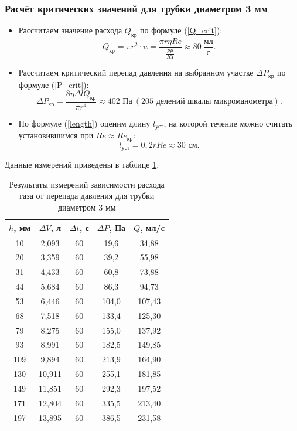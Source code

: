 \documentclass[a4paper, 12pt]{article}
\begin{document}
    \subsubsection*{Расчёт критических значений для трубки диаметром 3 мм}

    \begin{itemize}
        \item Рассчитаем значение расхода $Q_{\text{кр}}$ по формуле (\ref{Q_crit}): \[Q_{\text{кр}} = \pi r^2 \cdot \overline{u} = \frac{\pi r \eta Re}{\frac{p \mu}{RT}} \approx 80 \: \frac{\text{мл}}{\text{с}}. \] 
        
        \item  Рассчитаем критический перепад давления на выбранном участке $\Delta P_{\text{кр}}$ по формуле (\ref{P_crit}): \[ \Delta P_{\text{кр}} = \frac{8 \eta \Delta l Q_\text{кр}}{\pi r^4} \approx 402 \text{ Па} \: (205 \text{ делений шкалы микроманометра}). \]

        \item По формуле (\ref{length}) оценим длину $l_\text{уст}$, на которой течение можно считать установившимся при $Re \approx Re_\text{кр}$: \[ l_{\text{уст}} = 0,2 r Re \approx 30 \text{ см}. \]
 
    \end{itemize}
    
    \noindent Данные измерений приведены в таблице \ref{tab:q(p)_3mm}.

    \begin{table}[H]
        \centering
        \begin{tabular}{|c|c|c|c|c|}
            \hline
            $h$, мм & $\Delta V$, л & $\Delta t$, с & $\Delta P$, Па & $Q$, мл/c \\ \hline
            10 & 2,093 & 60 & 19,6 & 34,88 \\ \hline
            20 & 3,359 & 60 & 39,2 & 55,98 \\ \hline
            31 & 4,433 & 60 & 60,8 & 73,88 \\ \hline
            44 & 5,684 & 60 & 86,3 & 94,73 \\ \hline
            53 & 6,446 & 60 & 104,0 & 107,43 \\ \hline
            68 & 7,518 & 60 & 133,4 & 125,30 \\ \hline
            79 & 8,275 & 60 & 155,0 & 137,92 \\ \hline
            93 & 8,991 & 60 & 182,5 & 149,85 \\ \hline
            109 & 9,894 & 60 & 213,9 & 164,90 \\ \hline
            130 & 10,911 & 60 & 255,1 & 181,85 \\ \hline
            149 & 11,851 & 60 & 292,3 & 197,52 \\ \hline
            171 & 12,804 & 60 & 335,5 & 213,40 \\ \hline
            197 & 13,895 & 60 & 386,5 & 231,58 \\ \hline
        \end{tabular}
        \caption{Результаты измерений зависимости расхода газа от перепада давления для трубки диаметром 3 мм}
        \label{tab:q(p)_3mm}
    \end{table}
\end{document}
